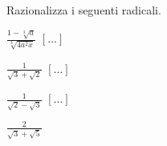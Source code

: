 \begin{esercizio}
 \label{ese:2.72}
Razionalizza i seguenti radicali.
 \begin{multicols}{4}
 \begin{enumeratea}
 \item $\frac{1-\sqrt[3]a}{\sqrt[3]{4a^2x}}$
  \hfill $\left[...\right]$
 \item $\frac 1{\sqrt 3+\sqrt 2}$
  \hfill $\left[...\right]$
 \item $\frac 1{\sqrt 2-\sqrt 3}$
  \hfill $\left[...\right]$
 \item $\frac 2{\sqrt 3+\sqrt 5}$

\end{enumeratea}
\end{multicols}
\end{esercizio}
